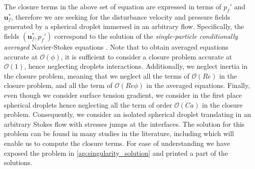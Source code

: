 The closure terms in the above set of equation are expressed in terms of $p_f'$ and $\textbf{u}_f^*$, therefore we are seeking for the disturbance velocity and pressure fields generated by a spherical droplet immersed in an arbitrary flow. 
Specifically, the fields $(\textbf{u}_f^*,p_f')$ correspond to the solution of the 
 \textit{single-particle conditionally averaged} Navier-Stokes equations \citep{hinch1977averaged,zhang1994averaged,fintzi2025}. 
Note that to obtain averaged equations accurate at $\mathcal{O}(\phi)$, it is sufficient to consider a closure problem accurate at $\mathcal{O}(1)$\citep{hinch1977averaged,zhang1994averaged}, hence neglecting droplets interactions.
Additionally, we neglect inertia in the closure problem, meaning that we neglect all the terms of $\mathcal{O}(Re)$ in the closure problem, and all the term of $\mathcal{O}(Re\phi)$ in the averaged equations. 
Finally, even though we consider surface tension gradient, we consider in the first place spherical droplets hence neglecting all the term of order $\mathcal{O}(Ca)$ in the closure problem. 
Consequently, we consider an isolated spherical droplet translating in an arbitrary Stokes flow with stresses jumps at the interfaces.
The solution for this problem can be found in many studies in the literature, including \citet{raja2010inertial,leal2007advanced,pozrikidis1992boundary,kim2013microhydrodynamics,pozrikidis2011introduction,nadim1991motion,fre} which will enable us to compute the closure terms.
For ease of understanding we have exposed the problem in \ref{ap:singularity_solution} and printed a part of the solutions. 

